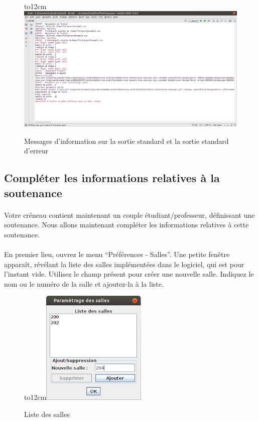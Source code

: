\documentclass[a4paper,10pt]{report}
\begin{document}
	~\\
	\begin{figure}[H]
	  \hbox to12cm{\hss\includegraphics[width=18cm]{../general/console.png}\hss}
	  \caption{Messages d'information sur la sortie standard et la sortie standard d'erreur }
	\end{figure}
	\newpage
	
      \subsection{Compléter les informations relatives à la soutenance}
	\paragraph{}
	  Votre créneau contient maintenant un couple étudiant/professeur, définissant une soutenance.
	  Nous allons maintenant compléter les informations relatives à cette soutenance.
	 
	\paragraph{}
	  En premier lieu, ouvrez le menu ``Préférences - Salles''. 
	  Une petite fenêtre apparaît, révélant la liste des salles implémentées dans le logiciel, qui est pour l'instant vide.
	  Utilisez le champ présent pour créer une nouvelle salle.
	  Indiquez le nom ou le numéro de la salle et ajoutez-la à la liste.
	  
	   \begin{figure}[H]
	    \hbox to12cm{\hss\includegraphics[width=5cm]{../general/Salles.png}\hss}
	    \caption{Liste des salles}
	  \end{figure}
	  
\end{document}

